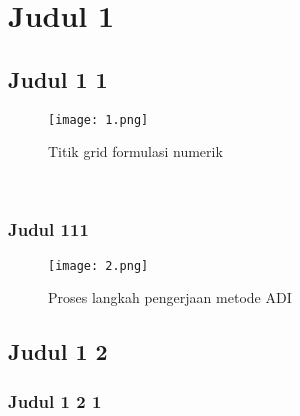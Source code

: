 \section{Judul 1 }
\thispagestyle{empty} %

\paragraph*{} 
\lipsum[2-3]

\subsection{Judul 1 1}
\lipsum[4]
\begin{figure*} [h]
	\centering
	\texttt{[image: 1.png]}
	\caption{Titik grid formulasi numerik \textbf{\cite{hoff153}}}
	\label{G01}
\end{figure*}\\

\subsubsection{Judul 111}
\lipsum[4-5]
\begin{figure*}[h]
	\centering
	\texttt{[image: 2.png]}
	\caption{Proses langkah pengerjaan metode ADI \textbf{\cite{hoff166}}}
	\label{G02}
\end{figure*}

\subsection{Judul 1 2}
\lipsum[5-7]
\subsubsection{Judul 1 2 1}
\lipsum[8]